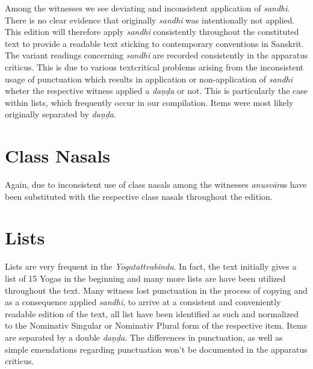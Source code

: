 Among the witnesses we see deviating and inconsistent application of \textit{sandhi}. There is no clear evidence that originally \textit{sandhi} was intentionally not applied. This edition will therefore apply \textit{sandhi} consistently throughout the constituted text to provide a readable text sticking to contemporary conventions in Sanskrit. The variant readings concerning \textit{sandhi} are recorded consistently in the apparatus criticus. This is due to various textcritical problems arising from the inconsistent usage of punctuation which results in application or non-application of \textit{sandhi} wheter the respective witness applied a \textit{daṇḍa} or not. This is particularly the case within lists, which frequently occur in our compilation. Items were most likely originally separated by \textit{daṇḍa}. 

\section{Class Nasals}

Again, due to inconsistent use of class nasals among the witnesses \textit{anusvāra}s have been substituted with the respective class nasals throughout the edition.

\section{Lists}

Lists are very frequent in the \textit{Yogatattvabindu}. In fact, the text initially gives a list of 15 Yogas in the beginning and many more lists are have been utilized throughout the text. Many witness lost punctuation in the process of copying and as a consequence applied \textit{sandhi}, to arrive at a consistent and conveniently readable edition of the text, all list have been identified as such and normalized to the Nominativ Singular or Nominativ Plural form of the respective item. Items are separated by a double \textit{daṇḍa}. The differences in punctuation, as well as simple emendations regarding punctuation  won't be documented in the apparatus criticus. 
\clearpage

